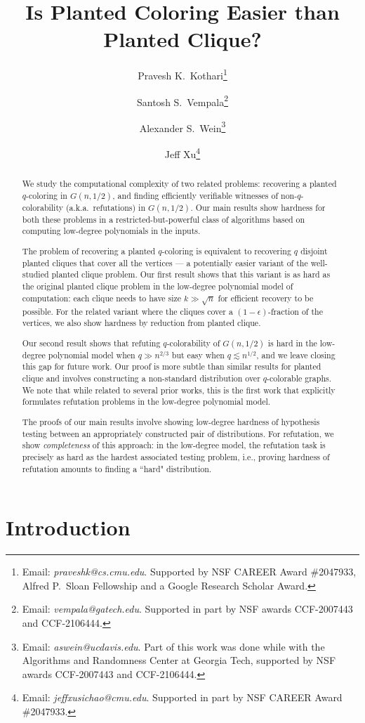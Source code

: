 \documentclass{article}
\title{Is Planted Coloring Easier than Planted Clique?}
\date{}
\author[1]{Pravesh K.\ Kothari\thanks{Email: \textit{praveshk@cs.cmu.edu}. Supported by  NSF CAREER Award \#2047933, Alfred P.\ Sloan Fellowship and a Google Research Scholar Award.}}
\author[2]{Santosh S.\ Vempala\thanks{Email: \textit{vempala@gatech.edu}. Supported in part by NSF awards CCF-2007443 and CCF-2106444.}}
\author[3]{Alexander S.\ Wein\thanks{Email: \textit{aswein@ucdavis.edu}. Part of this work was done while with the Algorithms and Randomness Center at Georgia Tech, supported by NSF awards CCF-2007443 and CCF-2106444.}}
\author[1]{Jeff Xu\thanks{Email: \textit{jeffxusichao@cmu.edu}. Supported in part by NSF CAREER Award \#2047933.}}
\affil[1]{Computer Science Department, Carnegie Mellon University}
\affil[2]{School of Computer Science, Georgia Tech}
\affil[3]{Department of Mathematics, University of California, Davis}
\begin{document}
\maketitle

\begin{abstract}
We study the computational complexity of two related problems: recovering a planted $q$-coloring in $G(n,1/2)$, and finding efficiently verifiable witnesses of non-$q$-colorability (a.k.a.\ refutations) in $G(n,1/2)$. Our main results show hardness for both these problems in a restricted-but-powerful class of algorithms based on computing low-degree polynomials in the inputs.

The problem of recovering a planted $q$-coloring is equivalent to recovering $q$ disjoint planted cliques that cover all the vertices --- a potentially easier variant of the well-studied planted clique problem. Our first result shows that this variant is as hard as the original planted clique problem in the low-degree polynomial model of computation: each clique needs to have size $k \gg \sqrt{n}$ for efficient recovery to be possible. For the related variant where the cliques cover a $(1-\epsilon)$-fraction of the vertices, we also show hardness by reduction from planted clique.

Our second result shows that refuting $q$-colorability of $G(n,1/2)$ is hard in the low-degree polynomial model when $q \gg n^{2/3}$ but easy when $q \lesssim n^{1/2}$, and we leave closing this gap for future work. Our proof is more subtle than similar results for planted clique and involves constructing a non-standard distribution over $q$-colorable graphs. We note that while related to several prior works, this is the first work that explicitly formulates refutation problems in the low-degree polynomial model.

The proofs of our main results involve showing low-degree hardness of hypothesis testing between an appropriately constructed pair of distributions. For refutation, we show \emph{completeness} of this approach: in the low-degree model, the refutation task is precisely as hard as the hardest associated testing problem, i.e., proving hardness of refutation amounts to finding a ``hard" distribution.
\end{abstract}



\section{Introduction}
\end{document}
